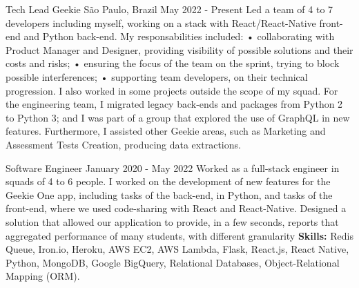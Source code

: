 \documentclass[11pt, a4paper]{awesome-cv-res}
\begin{document}
\makecvheader
\makecvfooter
{}
{}
{\thepage}

\begin{cventries}
\cventry
{Tech Lead}
{Geekie}
{São Paulo, Brazil}
{May 2022 - Present}
{
    Led a team of 4 to 7 developers including myself, working on a stack
    with React/React-Native front-end and Python back-end.
    My responsabilities included:
    \newline \hspace{1em} • collaborating with Product Manager and 
    Designer, providing visibility of possible solutions and their costs 
    and risks;
    \newline \hspace{1em} • ensuring the focus of the team on the 
    sprint, trying to block possible interferences;
    \newline \hspace{1em} • supporting team developers, on their 
    technical progression.
    \newline I also worked in some projects outside the scope of my squad. 
    For the engineering team, I migrated legacy 
    back-ends and packages from Python 2 to Python 3; and I was part of 
    a group that explored the use of GraphQL in new features. 
    Furthermore, I assisted other Geekie areas, such as Marketing and 
    Assessment Tests Creation, producing data extractions.
}    
    
\cventry
{Software Engineer}
{}
{}
{January 2020 - May 2022}
{Worked as a full-stack engineer in squads of 4 to 6 people. I worked on
the development of new features for the Geekie One app, including tasks 
of the back-end, in Python, and tasks of the front-end, where we used 
code-sharing with React and React-Native. Designed a solution that 
allowed our application to provide, in a few seconds, reports that
aggregated performance of many students, with different granularity
\newline\textbf{Skills:}  Redis Queue, Iron.io, Heroku, AWS EC2, AWS
    Lambda, Flask, React.js, React Native, Python, MongoDB, Google 
    BigQuery, Relational Databases, Object-Relational Mapping (ORM).
}


\end{cventries}
\end{document}
